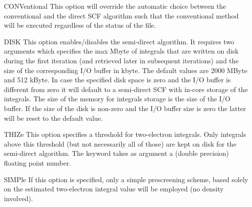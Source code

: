 \begin{keywordlist}
\item[CONVentional]
This option will override the automatic choice between the conventional
and the direct SCF algorithm such that the conventional method will
be executed regardless of the status of the  file.
\item[DISK]
This option enables/disables the semi-direct algorithm. It requires
two arguments which specifies the max Mbyte of integrals that are written
on disk during the first iteration (and retrieved later in subsequent
iterations)
and the size of the corresponding I/O buffer in kbyte.
The default values are
2000 MByte and 512 kByte. In case the specified disk space is zero and the I/O buffer
is different from zero it will default to a semi-direct SCF with in-core storage
of the integrals. The size of the memory for integrals storage is the size of the
I/O buffer. If the size of the disk is non-zero and the I/O buffer size is zero the
latter will be reset to the default value.
\item[THIZe]
This option specifies a threshold for two{}-electron integrals.
Only integrals above this threshold (but not necessarily all of those) are kept
on disk for the semi-direct algorithm.
The keyword takes as argument a (double precision) floating point number.
\item[SIMPle]
If this option is specified, only a simple prescreening scheme,
based solely on the
estimated two{}-electron integral value will be employed (no density involved).
\end{keywordlist}

